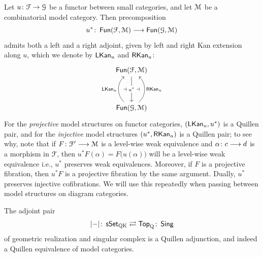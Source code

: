 \begin{example}
  Let $u \colon \mathcal F \to \mathcal G$ be a functor between small categories, and let
  $\mathcal M$ be a combinatorial model category.  Then precomposition
  \[
    u^{\ast} \colon \operatorname{{\sf Fun}}(\mathcal F,\mathcal M) \longrightarrow \operatorname{{\sf Fun}}(\mathcal G,\mathcal M)
  \]
  admits both a left and a right adjoint, given by left and right Kan
  extension along $u$, which we denote by $\operatorname{{\sf LKan}}_u$ and $\operatorname{{\sf RKan}}_u$:
    \begin{equation}
        \begin{tikzcd}[ampersand replacement=\&]
        {\fun(\cF,\cM)} \\
        \\
        {\fun(\cG,\cM)}
        \arrow[""{name=0, anchor=center, inner sep=0}, "{u^*}"{description}, from=1-1, to=3-1]
        \arrow[""{name=1, anchor=center, inner sep=0}, "{\lkan_{u}}", bend left=50, from=3-1, to=1-1]
        \arrow[""{name=2, anchor=center, inner sep=0}, "{\rkan_{u}}"', bend right=50, from=3-1, to=1-1]
        \arrow["\dashv"{anchor=center}, draw=none, from=0, to=2]
        \arrow["\dashv"{anchor=center}, draw=none, from=1, to=0]
        \end{tikzcd}
    \end{equation}
  For the \emph{projective} model structures on functor categories,
  $(\operatorname{{\sf LKan}}_u,u^{\ast})$ is a Quillen pair, and for the \emph{injective}
  model structures $(u^{\ast},\operatorname{{\sf RKan}}_u)$ is a Quillen pair; to see why, note that if $F\colon \mathcal F'\longrightarrow \mathcal M$ is a level-wise weak equivalence and $\alpha \colon c \longrightarrow d$ is a morphism in $\mathcal F$, then $u^{*}F(\alpha) = F\big(u(\alpha)\big)$ will be a level-wise weak equivalence i.e., $u^*$ preserves weak equivalences. Moreover, if $F$ is a projective fibration, then $u^* F$ is a projective fibration by the same argument. Dually, $u^*$ preserves injective cofibrations. We will use this repeatedly when passing
  between model structures on diagram categories.
\end{example}

\begin{theorem}
  \label{ch2:: thm: homotopy hyp}
  The adjoint pair
  \begin{equation}
    |{-}| \colon \operatorname{\sf sSet}_{\mathrm{QK}}
    \rightleftarrows
    \operatorname{\mathsf{Top}}_{\mathrm Q} \colon \operatorname{\mathsf{Sing}}
  \end{equation}
  of geometric realization and singular complex is a Quillen adjunction, and
  indeed a Quillen equivalence of model categories.
\end{theorem}

